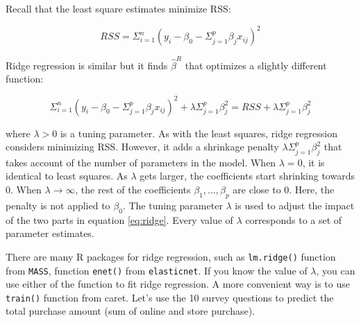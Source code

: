 \documentclass[12pt,]{krantz}
\makeatletter
\newenvironment{Shaded}{\begin{snugshade}}{\end{snugshade}}
\newcommand{\CommentTok}[1]{\textcolor[rgb]{0.37,0.37,0.37}{\textit{#1}}}
\newcommand{\DecValTok}[1]{\textcolor[rgb]{0.06,0.06,0.06}{#1}}
\newcommand{\KeywordTok}[1]{\textcolor[rgb]{0.27,0.27,0.27}{\textbf{#1}}}
\newcommand{\NormalTok}[1]{#1}
\newcommand{\OperatorTok}[1]{\textcolor[rgb]{0.43,0.43,0.43}{\textbf{#1}}}
\newcommand{\StringTok}[1]{\textcolor[rgb]{0.5,0.5,0.5}{#1}}
\newenvironment{kframe}{%
\medskip{}
\setlength{\fboxsep}{.8em}
 \def\at@end@of@kframe{}%
 \ifinner\ifhmode%
  \def\at@end@of@kframe{\end{minipage}}%
  \begin{minipage}{\columnwidth}%
 \fi\fi%
 \def\FrameCommand##1{\hskip\@totalleftmargin \hskip-\fboxsep
 \colorbox{shadecolor}{##1}\hskip-\fboxsep
     \hskip-\linewidth \hskip-\@totalleftmargin \hskip\columnwidth}%
 \MakeFramed {\advance\hsize-\width
   \@totalleftmargin\z@ \linewidth\hsize
   \@setminipage}}%
 {\par\unskip\endMakeFramed%
 \at@end@of@kframe}
\renewenvironment{Shaded}{\begin{kframe}}{\end{kframe}}
\makeatother
\begin{document}
Recall that the least square estimates minimize RSS:

\[RSS=\Sigma_{i=1}^{n}(y_{i}-\beta_{0}-\Sigma_{j=1}^{p}\beta_{j}x_{ij})^{2}\]

Ridge regression \citep{Hoerl1970} is similar but it finds \(\hat{\beta}^{R}\) that optimizes a slightly different function:

\begin{equation}
\Sigma_{i=1}^{n}(y_{i}-\beta_{0}-\Sigma_{j=1}^{p}\beta_{j}x_{ij})^{2}+\lambda\Sigma_{j=1}^{p}\beta_{j}^{2}=RSS+\lambda\Sigma_{j=1}^{p}\beta_{j}^{2}
\label{eq:ridge}
\end{equation}

where \(\lambda >0\) is a tuning parameter. As with the least squares, ridge regression considers minimizing RSS. However, it adds a shrinkage penalty \(\lambda\Sigma_{j=1}^{p}\beta_{j}^{2}\) that takes account of the number of parameters in the model. When \(\lambda = 0\), it is identical to least squares. As \(\lambda\) gets larger, the coefficients start shrinking towards 0. When \(\lambda\rightarrow\infty\), the rest of the coefficients \(\beta_{1},...,\beta_{p}\) are close to 0. Here, the penalty is not applied to \(\beta_{0}\). The tuning parameter \(\lambda\) is used to adjust the impact of the two parts in equation \eqref{eq:ridge}. Every value of \(\lambda\) corresponds to a set of parameter estimates.

There are many R packages for ridge regression, such as \texttt{lm.ridge()} function from \texttt{MASS}, function \texttt{enet()} from \texttt{elasticnet}. If you know the value of \(\lambda\), you can use either of the function to fit ridge regression. A more convenient way is to use \texttt{train()} function from caret. Let's use the 10 survey questions to predict the total purchase amount (sum of online and store purchase).

\begin{Shaded}
\end{Shaded}
\end{document}
